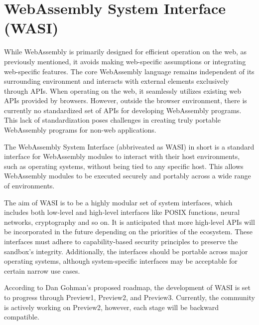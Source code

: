 \section{WebAssembly System Interface (WASI)}
\label{sec:wasi}
While WebAssembly is primarily designed for efficient operation on the web, as previously mentioned, it avoids making web-specific assumptions or integrating web-specific features. 
The core WebAssembly language remains independent of its surrounding environment and interacts with external elements exclusively through APIs. When operating on the web, it seamlessly utilizes existing web APIs provided by browsers. However, outside the browser environment, there is currently no standardized set of APIs for developing WebAssembly programs. This lack of standardization poses challenges in creating truly portable WebAssembly programs for non-web applications.

The WebAssembly System Interface (abbriveated as WASI) in short is a standard interface for WebAssembly modules to interact with their host environments, such as operating systems, without being tied to any specific host. This allows WebAssembly modules to be executed securely and portably across a wide range of environments. 

The aim of WASI is to be a highly modular set of system interfaces, which includes both low-level and high-level interfaces like \gls{POSIX} functions, neural networks, cryptography and so on. 
It is anticipated that more high-level APIs will be incorporated in the future depending on the priorities of the ecosystem. These interfaces must adhere to capability-based security principles to preserve the sandbox's integrity. Additionally, the interfaces should be portable across major operating systems, although system-specific interfaces may be acceptable for certain 
narrow use cases.

According to Dan Gohman's proposed roadmap, the development of WASI is set to progress through Preview1, Preview2, and Preview3. 
Currently, the community is actively working on Preview2, however, each stage will be backward compatible. 

